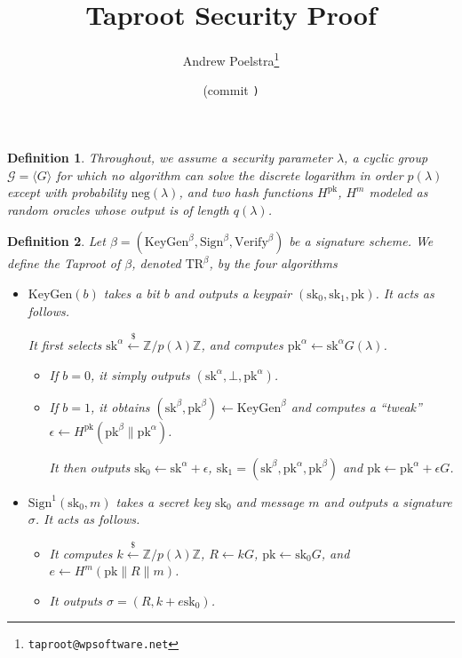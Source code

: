 \documentclass[letterpaper]{article}
\title{Taproot Security Proof}
\author{Andrew Poelstra\footnote{\texttt{taproot@wpsoftware.net}}}
\date{\gitAuthorDate{} (commit \texttt{\gitAbbrevHash)}}
\newtheorem{defn}{Definition}
\newcommand{\TR}[1]{\mathrm{TR}^{#1}}
\newcommand{\KeyGen}{\mathrm{KeyGen}}
\newcommand{\Sign}{\mathrm{Sign}}
\newcommand{\Verify}{\mathrm{Verify}}
\newcommand{\sk}{\mathrm{sk}}
\newcommand{\pk}{\mathrm{pk}}
\newcommand{\negl}{\mathrm{neg}}
\newcommand{\randgets}{\xleftarrow{\$}}
\begin{document}
\maketitle

\modulolinenumbers[10]

\begin{defn} Throughout, we assume a security parameter $\lambda$, a
cyclic group $\mathcal{G} = \langle G\rangle$ for which no algorithm can solve the
discrete logarithm in order $p(\lambda)$ except with probability
$\negl(\lambda)$, and two hash functions $H^\pk$, $H^m$ modeled as
random oracles whose output is of length $q(\lambda)$.\end{defn}

\begin{defn} Let $\beta = (\KeyGen^\beta, \Sign^\beta, \Verify^\beta)$ be a
signature scheme. We define the \emph{Taproot} of
$\beta$, denoted $\TR{\beta}$, by the four algorithms

\begin{itemize}
\item $\KeyGen(b)$ takes a bit $b$ and outputs a keypair
$(\sk_0, \sk_1, \pk)$. It acts as follows.

It first selects $\sk^\alpha\randgets\mathbb{Z}/p(\lambda)\mathbb{Z}$,
and computes $\pk^\alpha\gets\sk^\alpha G(\lambda)$.

\begin{itemize}
\item If $b=0$, it simply outputs $(\sk^\alpha, \bot, \pk^\alpha)$.
\item If $b=1$, it obtains $(\sk^\beta, \pk^\beta) \gets \KeyGen^\beta$ and computes
a ``tweak'' $\epsilon\gets H^\pk(\pk^\beta\|\pk^\alpha)$.

It then outputs $\sk_0\gets\sk^\alpha+\epsilon$, $\sk_1=(\sk^\beta, \pk^\alpha, \pk^\beta)$ and
$\pk\gets\pk^\alpha+\epsilon G$.
\end{itemize}

\item $\Sign^1(\sk_0, m)$ takes a secret key $\sk_0$ and message $m$ and outputs
a signature $\sigma$. It acts as follows.
\begin{itemize}
\item It computes $k\randgets\mathbb{Z}/p(\lambda)\mathbb{Z}$, $R\gets kG$, $\pk\gets
\sk_0G$, and $e\gets H^m(\pk\|R\|m)$.
\item It outputs $\sigma = (R, k + e\sk_0)$.
\end{itemize}


\end{itemize}
\end{defn}
\end{document}
